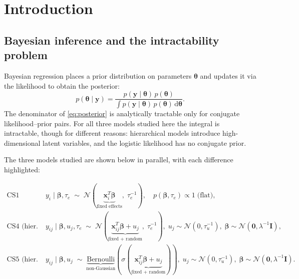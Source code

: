 \documentclass[11pt,a4paper]{article}
\begin{document}
\newpage
\tableofcontents
\newpage

\section*{Introduction}

\subsection*{Bayesian inference and the intractability problem}

Bayesian regression places a prior distribution on parameters $\bm{\theta}$ and updates
it via the likelihood to obtain the posterior:
\begin{equation}
  p(\bm{\theta}\mid\bm{y})
  = \frac{p(\bm{y}\mid\bm{\theta})\,p(\bm{\theta})}
         {\displaystyle\int p(\bm{y}\mid\bm{\theta})\,p(\bm{\theta})\,\mathrm{d}\bm{\theta}}.
  \label{eq:posterior}
\end{equation}
The denominator of \eqref{eq:posterior} is analytically tractable only for conjugate
likelihood--prior pairs.
For all three models studied here the integral is intractable, though for different reasons:
hierarchical models introduce high-dimensional latent variables, and the logistic
likelihood has no conjugate prior.

\medskip
The three models studied are shown below in parallel, with each difference
highlighted:

\begin{align}
  \text{CS1 (linear):}\quad
  & y_i \mid \bm{\beta}, \tau_e
    \;\sim\; \mathcal{N}\!\left(
      \underbrace{\bm{x}_i^T\bm{\beta}}_{\text{fixed effects}},\;
      \tau_e^{-1}
    \right),
    \quad
    p(\bm{\beta},\tau_e)\propto 1\;\text{(flat)},
    \nonumber\\[6pt]
  \text{CS4 (hier.\ linear):}\quad
  & y_{ij}\mid\bm{\beta},u_j,\tau_e
    \;\sim\; \mathcal{N}\!\left(
      \underbrace{\bm{x}_{ij}^T\bm{\beta}+u_j}_{\text{fixed + random}},\;
      \tau_e^{-1}
    \right),\;
    u_j\!\sim\!\mathcal{N}(0,\tau_u^{-1}),\;
    \bm{\beta}\!\sim\!\mathcal{N}(\bm{0},\lambda^{-1}\bm{I}),
    \nonumber\\[6pt]
  \text{CS5 (hier.\ logistic):}\quad
  & y_{ij}\mid\bm{\beta},u_j
    \;\sim\;
    \underbrace{\mathrm{Bernoulli}}_{\text{non-Gaussian}}\!\!\left(
      \sigma\!\!\left(
        \underbrace{\bm{x}_{ij}^T\bm{\beta}+u_j}_{\text{fixed + random}}
      \right)
    \right),\;
    u_j\!\sim\!\mathcal{N}(0,\tau_u^{-1}),\;
    \bm{\beta}\!\sim\!\mathcal{N}(\bm{0},\lambda^{-1}\bm{I}).
    \nonumber
\end{align}
\end{document}
